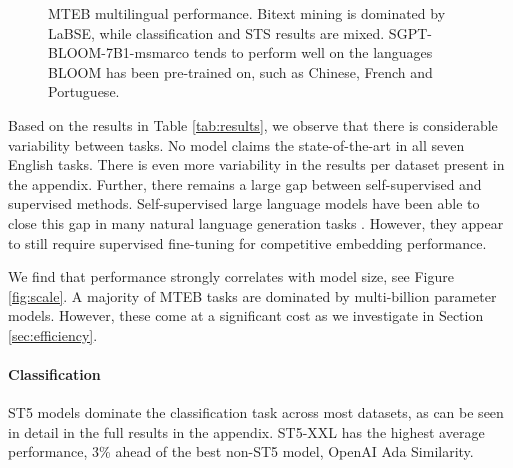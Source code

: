 \documentclass[11pt]{article}
\begin{document}
\begin{figure*}[t]
    \centering
    \qquad
    \qquad
    \caption{MTEB multilingual performance. Bitext mining is dominated by LaBSE, while classification and STS results are mixed. SGPT-BLOOM-7B1-msmarco tends to perform well on the languages BLOOM has been pre-trained on, such as Chinese, French and Portuguese.}
    \label{fig:multilingual}
\end{figure*}

Based on the results in Table \ref{tab:results}, we observe that there is considerable variability between tasks. No model claims the state-of-the-art in all seven English tasks. There is even more variability in the results per dataset present in the appendix. Further, there remains a large gap between self-supervised and supervised methods. Self-supervised large language models have been able to close this gap in many natural language generation tasks \cite{chowdhery2022palm}. However, they appear to still require supervised fine-tuning for competitive embedding performance.

We find that performance strongly correlates with model size, see Figure \ref{fig:scale}. A majority of MTEB tasks are dominated by multi-billion parameter models. However, these come at a significant cost as we investigate in Section \ref{sec:efficiency}.

\paragraph{Classification} ST5 models dominate the classification task across most datasets, as can be seen in detail in the full results in the appendix. ST5-XXL has the highest average performance, 3\% ahead of the best non-ST5 model, OpenAI Ada Similarity.
\end{document}

